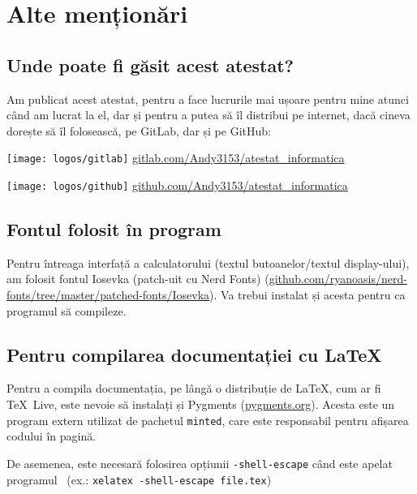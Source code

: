 \section{Alte menționări}
\subsection{Unde poate fi găsit acest atestat?}
Am publicat acest atestat, pentru a face lucrurile mai ușoare pentru mine atunci când am lucrat la el, dar și pentru a putea să îl distribui pe internet, dacă cineva dorește să îl folosească, pe GitLab, dar și pe GitHub:

\begin{center}
 \texttt{[image: logos/gitlab]}
 \url{gitlab.com/Andy3153/atestat_informatica}
  
 \texttt{[image: logos/github]}
 \url{github.com/Andy3153/atestat_informatica}
\end{center}

\subsection{Fontul folosit în program}
Pentru întreaga interfață a calculatorului (textul butoanelor/textul display-ului), am folosit fontul Iosevka (patch-uit cu Nerd Fonts) (\url{github.com/ryanoasis/nerd-fonts/tree/master/patched-fonts/Iosevka}). Va trebui instalat și acesta pentru ca programul să compileze.

\subsection{Pentru compilarea documentației cu \LaTeX}
Pentru a compila documentația, pe lângă o distribuție de \LaTeX, cum ar fi \TeX\ Live, este nevoie să instalați și Pygments (\url{pygments.org}). Acesta este un program extern utilizat de pachetul \texttt{minted}, care este responsabil pentru afișarea codului în pagină.

De asemenea, este necesară folosirea opțiunii \texttt{-shell-escape} când este apelat programul \XeLaTeX\ (ex.: \texttt{xelatex -shell-escape file.tex})
